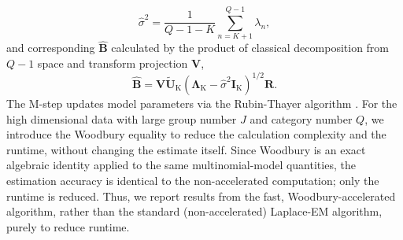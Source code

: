 \begin{equation}
    \hat{\sigma}^{2}=\frac{1}{Q-1-K}\sum_{n=K+1}^{Q-1}\lambda_{n},
    \label{eq:tipping-ppca_sigma_deflate}
\end{equation}
and corresponding $\hat{\mathbf{B}}$ calculated by the product of classical decomposition from $Q-1$ space and transform projection $\mathbf{V}$,
\begin{equation}
    \hat{\mathbf{B}}=\mathbf{V}\tilde{\mathbf{U}}_{\mathrm{K}}\left(\bm{\Lambda}_{\mathrm{K}}-\hat{\sigma}^{2}\mathbf{I}_\mathrm{K}\right)^{1/2}\mathbf{R}.
    \label{eq:tipping-ppca_b_deflate}
\end{equation}
The M-step updates model parameters via the Rubin-Thayer algorithm \citep{Rubin1982}. For the high dimensional data with large group number $J$ and category number $Q$, we introduce the Woodbury equality to reduce the calculation complexity and the runtime, without changing the estimate itself. Since Woodbury is an exact algebraic identity applied to the same multinomial-model quantities, the estimation accuracy is identical to the non-accelerated computation; only the runtime is reduced. Thus, we report results from the fast, Woodbury-accelerated algorithm, rather than the standard (non-accelerated) Laplace-EM algorithm, purely to reduce runtime.

